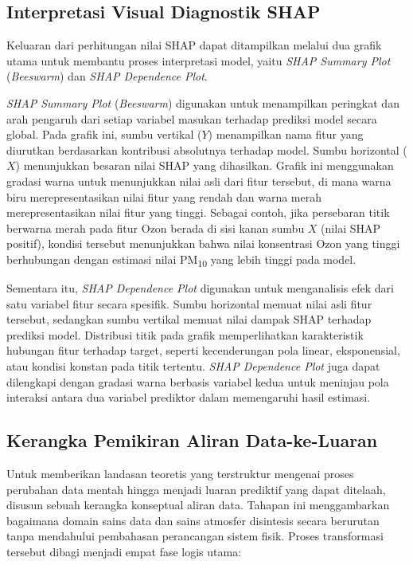 \subsection{Interpretasi Visual Diagnostik SHAP}

Keluaran dari perhitungan nilai SHAP dapat ditampilkan melalui dua grafik utama untuk membantu proses interpretasi model, yaitu \textit{SHAP Summary Plot} (\textit{Beeswarm}) dan \textit{SHAP Dependence Plot}.

\textit{SHAP Summary Plot} (\textit{Beeswarm}) digunakan untuk menampilkan peringkat dan arah pengaruh dari setiap variabel masukan terhadap prediksi model secara global. Pada grafik ini, sumbu vertikal ($Y$) menampilkan nama fitur yang diurutkan berdasarkan kontribusi absolutnya terhadap model. Sumbu horizontal ($X$) menunjukkan besaran nilai SHAP yang dihasilkan. Grafik ini menggunakan gradasi warna untuk menunjukkan nilai asli dari fitur tersebut, di mana warna biru merepresentasikan nilai fitur yang rendah dan warna merah merepresentasikan nilai fitur yang tinggi. Sebagai contoh, jika persebaran titik berwarna merah pada fitur Ozon berada di sisi kanan sumbu $X$ (nilai SHAP positif), kondisi tersebut menunjukkan bahwa nilai konsentrasi Ozon yang tinggi berhubungan dengan estimasi nilai \MakeUppercase{pm}\textsubscript{10} yang lebih tinggi pada model.

Sementara itu, \textit{SHAP Dependence Plot} digunakan untuk menganalisis efek dari satu variabel fitur secara spesifik. Sumbu horizontal memuat nilai asli fitur tersebut, sedangkan sumbu vertikal memuat nilai dampak SHAP terhadap prediksi model. Distribusi titik pada grafik memperlihatkan karakteristik hubungan fitur terhadap target, seperti kecenderungan pola linear, eksponensial, atau kondisi konstan pada titik tertentu. \textit{SHAP Dependence Plot} juga dapat dilengkapi dengan gradasi warna berbasis variabel kedua untuk meninjau pola interaksi antara dua variabel prediktor dalam memengaruhi hasil estimasi.

\subsection{Kerangka Pemikiran Aliran Data-ke-Luaran}
\label{subsection:kerangka_transformasi}

Untuk memberikan landasan teoretis yang terstruktur mengenai proses perubahan data mentah hingga menjadi luaran prediktif yang dapat ditelaah, disusun sebuah kerangka konseptual aliran data. Tahapan ini menggambarkan bagaimana domain sains data dan sains atmosfer disintesis secara berurutan tanpa mendahului pembahasan perancangan sistem fisik. Proses transformasi tersebut dibagi menjadi empat fase logis utama:

